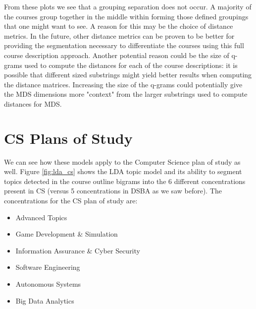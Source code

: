 From these plots we see that a grouping separation does not occur.  A majority of the courses group together in the middle within forming those defined 
groupings that one might want to see. A reason for this may be the choice of distance metrics. In the future, other distance metrics can be proven to be  
better for providing the segmentation necessary to differentiate the courses using this full course description approach.  Another potential reason could be 
the size of q-grams used to compute the distances for each of the course descriptions: it is possible that different sized substrings might yield better results 
when computing the distance matrices. Increasing the size of the q-grams could potentially give the MDS dimensions more "context" from the larger substrings 
used to compute distances for MDS. 





\section{CS Plans of Study}

We can see how these models apply to the Computer Science plan of study as well. Figure \ref{fig:lda_cs} shows the LDA topic 
model and its ability to segment topics detected in the course outline bigrams into the 6 different concentrations present in CS (versus 5 concentrations in 
DSBA as we saw before). 
The concentrations for the CS plan of study are: 

\begin{itemize}
  \item Advanced Topics  
  \item Game Development \& Simulation  
  \item Information Assurance \& Cyber Security  
  \item Software Engineering   
  \item Autonomous Systems  
  \item Big Data Analytics  
\end{itemize}

